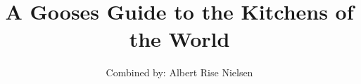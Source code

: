 \title{A Gooses Guide to the Kitchens of the World}
\author{Combined by: Albert Rise Nielsen}
\maketitle